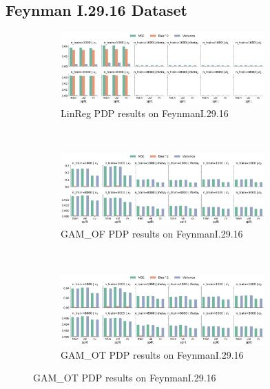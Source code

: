 \documentclass[runningheads]{llncs}
\begin{document}
\clearpage
\subsection{Feynman I.29.16 Dataset}

\begin{figure}[ht!]
    \centering
    \begin{subfigure}[b]{\textwidth}
        \centering
        \includegraphics[width=0.86\textwidth]{img/FeynmanI.29.16-all/feature_effect_errors_pdp_LinReg.png}
        \caption{LinReg PDP results on FeynmanI.29.16}
    \end{subfigure}
    \\[10pt]
    \vfill
    \begin{subfigure}[b]{\textwidth}
        \centering
        \includegraphics[width=0.86\textwidth]{img/FeynmanI.29.16-all/feature_effect_errors_pdp_GAM_OF.png}
        \caption{GAM\_OF PDP results on FeynmanI.29.16}
    \end{subfigure}
    \\[10pt]
    \vfill
    \begin{subfigure}[b]{\textwidth}
        \centering
        \includegraphics[width=0.86\textwidth]{img/FeynmanI.29.16-all/feature_effect_errors_pdp_GAM_OT.png}
        \caption{GAM\_OT PDP results on FeynmanI.29.16}
    \end{subfigure}
\end{figure}
\end{document}

